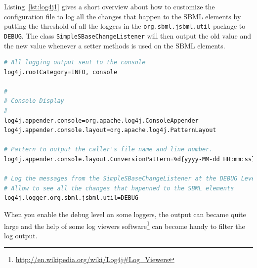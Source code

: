 Listing~\vref{lst:log4j1} gives a short overview about how to
customize the configuration file to log all the changes that happen to the SBML
elements by putting the threshold of all the loggers in the
\texttt{org.sbml.jsbml.util} package to \texttt{DEBUG}. The class
\texttt{SimpleSBaseChangeListener}
%
will then output the old value and the new value whenever a setter methods is
used on the SBML elements.
\begin{lstlisting}[language=bash,%numbers=none,
caption={A simple log4j example.},label=lst:log4j1]
# All logging output sent to the console
log4j.rootCategory=INFO, console

#
# Console Display
#
log4j.appender.console=org.apache.log4j.ConsoleAppender
log4j.appender.console.layout=org.apache.log4j.PatternLayout

# Pattern to output the caller's file name and line number.
log4j.appender.console.layout.ConversionPattern=%d{yyyy-MM-dd HH:mm:ss} - %5p (%F:%L) - %m%n

# Log the messages from the SimpleSBaseChangeListener at the DEBUG Level
# Allow to see all the changes that hapenned to the SBML elements
log4j.logger.org.sbml.jsbml.util=DEBUG
\end{lstlisting}

When you enable the debug level
%
on some loggers, the output can became quite large and the help of some log
viewers software\footnote{\url{http://en.wikipedia.org/wiki/Log4j\#Log_Viewers}}
can become handy to filter the log output.

